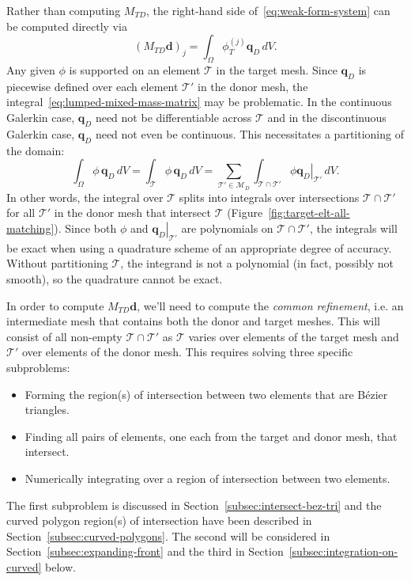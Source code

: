 \documentclass[oneside, reqno]{amsart}
\theoremstyle{definition}
\begin{document}
Rather than computing \(M_{TD}\), the right-hand side
of~\eqref{eq:weak-form-system} can be computed directly via
\begin{equation}\label{eq:lumped-mixed-mass-matrix}
\left(M_{TD} \bm{d}\right)_j = \int_{\Omega} \phi_T^{(j)} \bm{q}_D \, dV.
\end{equation}
Any given \(\phi\) is supported on an element \(\mathcal{T}\) in the
target mesh. Since \(\bm{q}_D\) is piecewise defined over each element
\(\mathcal{T}'\) in the donor mesh, the
integral~\eqref{eq:lumped-mixed-mass-matrix} may be problematic.
In the continuous Galerkin case, \(\bm{q}_D\) need not be differentiable
across \(\mathcal{T}\) and in the discontinuous Galerkin case,
\(\bm{q}_D\) need not even be continuous. This necessitates a
partitioning of the domain:
\begin{equation}
\int_{\Omega} \phi \, \bm{q}_D \, dV =
  \int_{\mathcal{T}} \phi \, \bm{q}_D \, dV =
  \sum_{\mathcal{T}' \in \mathcal{M}_D} \int_{\mathcal{T} \cap \mathcal{T}'}
    \phi \left.\bm{q}_D\right|_{\mathcal{T}'} \, dV.
\end{equation}
In other words, the integral over \(\mathcal{T}\) splits into integrals
over intersections \(\mathcal{T} \cap \mathcal{T}'\) for all
\(\mathcal{T}'\) in the donor mesh that intersect \(\mathcal{T}\)
(Figure~\ref{fig:target-elt-all-matching}). Since both \(\phi\) and
\(\left.\bm{q}_D\right|_{\mathcal{T}'}\) are polynomials on
\(\mathcal{T} \cap \mathcal{T}'\), the integrals will be exact when
using a quadrature scheme of an appropriate degree of accuracy.
Without partitioning \(\mathcal{T}\), the integrand is not a polynomial
(in fact, possibly not smooth), so the quadrature cannot be exact.

In order to compute \(M_{TD} \bm{d}\), we'll need to compute the
\emph{common refinement}, i.e. an intermediate mesh that contains
both the donor and target meshes. This will consist of all non-empty
\(\mathcal{T} \cap \mathcal{T}'\) as \(\mathcal{T}\) varies over
elements of the target mesh and \(\mathcal{T}'\) over elements of the
donor mesh. This requires solving three specific subproblems:
\begin{itemize}
\itemsep 0em
\item Forming the region(s) of intersection between two elements that
  are B\'{e}zier triangles.
\item Finding all pairs of elements, one each from the target and donor mesh,
  that intersect.
\item Numerically integrating over a region of intersection between two
  elements.
\end{itemize}
The first subproblem is discussed in
Section~\ref{subsec:intersect-bez-tri}
and the curved polygon region(s) of intersection have been described
in Section~\ref{subsec:curved-polygons}. The second will be considered
in Section~\ref{subsec:expanding-front} and the third in
Section~\ref{subsec:integration-on-curved} below.
\end{document}

